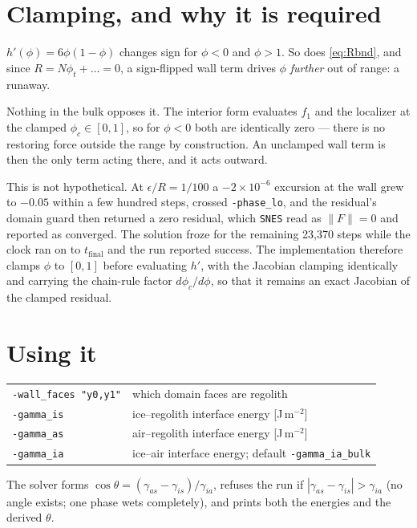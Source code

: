 \documentclass[11pt,a4paper]{article}
\newcommand{\code}[1]{\texttt{\small #1}}
\newcommand{\sia}{\gamma_{ia}}
\newcommand{\sis}{\gamma_{is}}
\newcommand{\sas}{\gamma_{as}}
\newcommand{\eps}{\epsilon}
\begin{document}
\section{Clamping, and why it is required}

$h'(\phi)=6\phi(1-\phi)$ changes sign for $\phi<0$ and $\phi>1$. So does
\eqref{eq:Rbnd}, and since $R=N\phi_t+\dots=0$, a sign-flipped wall term drives
$\phi$ \emph{further} out of range: a runaway.

Nothing in the bulk opposes it. The interior form evaluates $f_1$ and the
localizer at the clamped $\phi_c\in[0,1]$, so for $\phi<0$ both are identically
zero --- there is no restoring force outside the range by construction. An
unclamped wall term is then the only term acting there, and it acts outward.

This is not hypothetical. At $\eps/R=1/100$ a $-2\times10^{-6}$ excursion at the
wall grew to $-0.05$ within a few hundred steps, crossed \code{-phase\_lo}, and
the residual's domain guard then returned a zero residual, which \code{SNES} read
as $\|F\|=0$ and reported as converged. The solution froze for the remaining
23{,}370 steps while the clock ran on to $t_{\text{final}}$ and the run reported
success. The implementation therefore clamps $\phi$ to $[0,1]$ before evaluating
$h'$, with the Jacobian clamping identically and carrying the chain-rule factor
$d\phi_c/d\phi$, so that it remains an exact Jacobian of the clamped residual.

\section{Using it}

\begin{center}\begin{tabular}{@{}ll@{}}
\toprule
\code{-wall\_faces "y0,y1"} & which domain faces are regolith \\
\code{-gamma\_is} & ice--regolith interface energy [J\,m$^{-2}$] \\
\code{-gamma\_as} & air--regolith interface energy [J\,m$^{-2}$] \\
\code{-gamma\_ia} & ice--air interface energy; default \code{-gamma\_ia\_bulk} \\
\bottomrule
\end{tabular}\end{center}

The solver forms $\cos\theta=(\sas-\sis)/\sia$, refuses the run if
$|\sas-\sis|>\sia$ (no angle exists; one phase wets completely), and prints both
the energies and the derived $\theta$.
\end{document}
